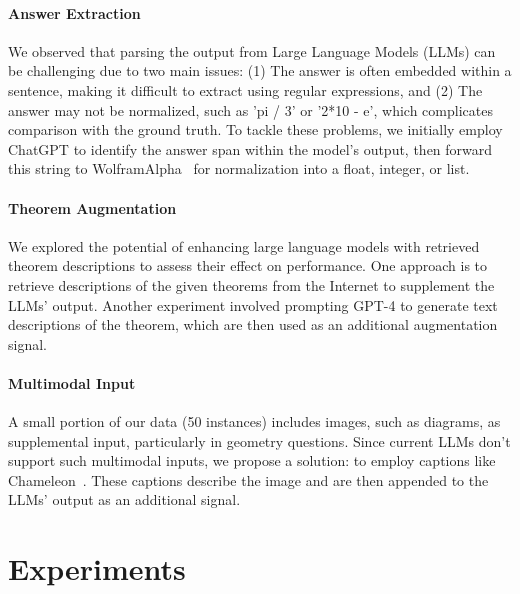 \documentclass[11pt]{article}
\begin{document}
\paragraph{Answer Extraction}
We observed that parsing the output from Large Language Models (LLMs) can be challenging due to two main issues: (1) The answer is often embedded within a sentence, making it difficult to extract using regular expressions, and (2) The answer may not be normalized, such as 'pi / 3' or '2*10 - e', which complicates comparison with the ground truth. To tackle these problems, we initially employ ChatGPT to identify the answer span within the model's output, then forward this string to WolframAlpha~\cite{Mathematica} for normalization into a float, integer, or list.

\paragraph{Theorem Augmentation}
We explored the potential of enhancing large language models with retrieved theorem descriptions to assess their effect on performance. One approach is to retrieve descriptions of the given theorems from the Internet to supplement the LLMs' output. Another experiment involved prompting GPT-4 to generate text descriptions of the theorem, which are then used as an additional augmentation signal.

\paragraph{Multimodal Input}
A small portion of our data (50 instances) includes images, such as diagrams, as supplemental input, particularly in geometry questions. Since current LLMs don't support such multimodal inputs, we propose a solution: to employ captions like Chameleon~\cite{lu2023chameleon}. These captions describe the image and are then appended to the LLMs' output as an additional signal.

\section{Experiments}
\end{document}
